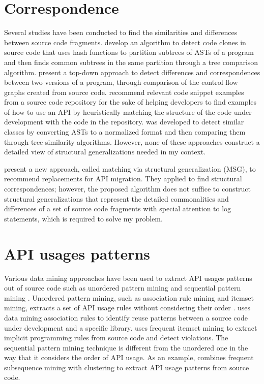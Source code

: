 \section{Correspondence}  \label{ch7-corr}
Several studies have been conducted to find the similarities and differences between source code fragments. \citet{baxter1998clone} develop an algorithm to detect code clones in source code that uses hash functions to partition subtrees of ASTs of a program and then finds common subtrees in the same partition through a tree comparison algorithm. \citet{apiwattanapong2004differencing} present a top-down approach to detect differences and correspondences between two versions of a  program, through comparison of the control flow graphs created from source code. \citet{2006:tse:holmes} recommend relevant code snippet examples from a source code repository for the sake of helping developers to find examples of how to use an API by heuristically matching the structure of the code under development with the code in the repository.  \cite{sager2006detecting} was developed to detect similar  classes by converting ASTs to a normalized format and then comparing them through tree similarity algorithms. However, none of these approaches construct a detailed view of structural generalizations needed in my context.



\citet{2014:uofc:cossette} present a new approach, called matching via structural generalization (MSG), to recommend replacements for API migration. They applied  to find structural correspondences; however, the proposed algorithm does not suffice to construct structural generalizations that represent the detailed commonalities and differences of a set of source code fragments with special attention to log statements, which is required to solve my problem.

\section{API usages patterns}  \label{ch7-usage-patterns}
Various data mining approaches have been used to extract API usages patterns out of source code such as unordered pattern mining and sequential pattern mining \cite{robillard2013automated}. Unordered pattern mining, such as association rule mining and itemset mining, extracts a set of API usage rules without considering their order \cite{agrawal1994fast}.  \cite{2000:icse:michail} uses data mining association rules to identify reuse patterns between a source code under development and a specific library.  \cite{li2005pr} uses frequent itemset mining to extract implicit programming rules from source code and detect violations. The sequential pattern mining technique is different from the unordered one in the way that it considers the order of API usage. As an example,  \cite{2006:msr:xie} combines frequent subsequence mining with clustering to extract API usage patterns from source code.

